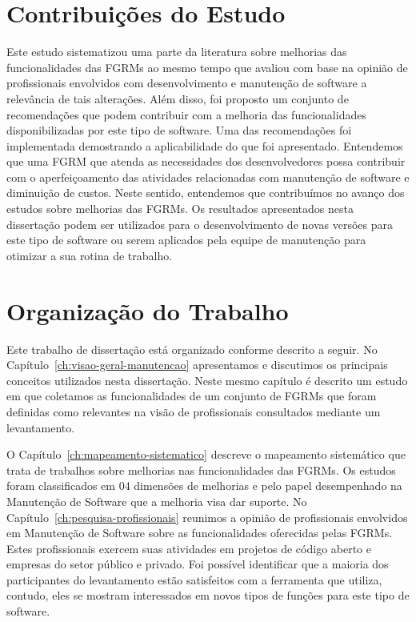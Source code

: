 \section{Contribuições do Estudo}
\label{sec:intro-contribuicao}

Este estudo sistematizou uma parte da literatura sobre melhorias das
funcionalidades das FGRMs ao mesmo tempo que avaliou com base na opinião de
profissionais envolvidos com desenvolvimento e manutenção de software a
relevância de tais alterações. Além disso, foi proposto um conjunto de
recomendações que podem contribuir com a melhoria das funcionalidades
disponibilizadas por este tipo de software. Uma das recomendações foi
implementada demostrando a aplicabilidade do que foi apresentado. Entendemos que
uma FGRM que atenda as necessidades dos desenvolvedores possa contribuir com o
aperfeiçoamento das atividades relacionadas com manutenção de software e
diminuição de custos. Neste sentido, entendemos que contribuímos no avanço dos
estudos sobre melhorias das FGRMs. Os resultados apresentados nesta dissertação
podem ser utilizados para o desenvolvimento de novas versões para este tipo de
software ou serem aplicados pela equipe de manutenção para otimizar a sua rotina
de trabalho.

\section{Organização do Trabalho}
\label{sec:intro-organizacao-dissertacao}

Este trabalho de dissertação está organizado conforme descrito a seguir. No
Capítulo~\ref{ch:visao-geral-manutencao} apresentamos e discutimos os principais
conceitos utilizados nesta dissertação. Neste mesmo capítulo é descrito um
estudo em que coletamos as funcionalidades de um conjunto de FGRMs que foram
definidas como relevantes na visão de profissionais consultados mediante um
levantamento.

O Capítulo~\ref{ch:mapeamento-sistematico} descreve o mapeamento sistemático que
trata de trabalhos sobre melhorias nas funcionalidades das FGRMs. Os estudos
foram classificados em 04 dimensões de melhorias e pelo papel desempenhado na
Manutenção de Software que a melhoria visa dar suporte. No
Capítulo~\ref{ch:pesquisa-profissionais} reunimos a opinião de profissionais
envolvidos em Manutenção de Software sobre as funcionalidades oferecidas pelas
FGRMs. Estes profissionais exercem suas atividades em projetos de código aberto
e empresas do setor público e privado. Foi possível identificar que a maioria
dos participantes do levantamento estão satisfeitos com a ferramenta que
utiliza, contudo, eles se mostram interessados em novos tipos de funções para
este tipo de software.

